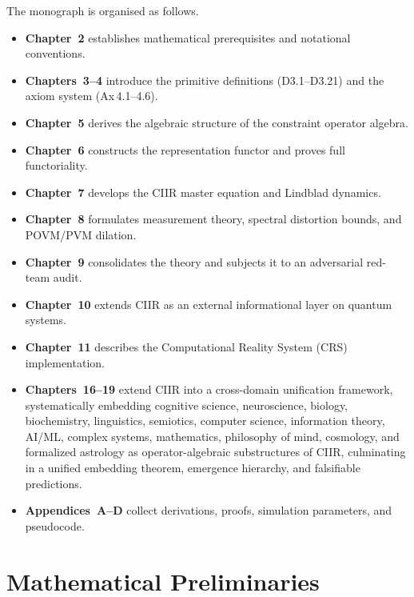 \documentclass[11pt,a4paper,openany]{book}
\theoremstyle{remark}
\begin{document}
The monograph is organised as follows.
\begin{itemize}[nosep]
  \item \textbf{Chapter~2} establishes mathematical prerequisites and
        notational conventions.
  \item \textbf{Chapters~3--4} introduce the primitive definitions
        (D3.1--D3.21) and the axiom system (Ax\,4.1--4.6).
  \item \textbf{Chapter~5} derives the algebraic structure of the
        constraint operator algebra.
  \item \textbf{Chapter~6} constructs the representation functor and
        proves full functoriality.
  \item \textbf{Chapter~7} develops the CIIR master equation and
        Lindblad dynamics.
  \item \textbf{Chapter~8} formulates measurement theory, spectral
        distortion bounds, and POVM/PVM dilation.
  \item \textbf{Chapter~9} consolidates the theory and subjects it to
        an adversarial red-team audit.
  \item \textbf{Chapter~10} extends CIIR as an external informational
        layer on quantum systems.
  \item \textbf{Chapter~11} describes the Computational Reality System
        (CRS) implementation.
  \item \textbf{Chapters~16--19} extend CIIR into a cross-domain
        unification framework, systematically embedding cognitive
        science, neuroscience, biology, biochemistry, linguistics,
        semiotics, computer science, information theory, AI/ML,
        complex systems, mathematics, philosophy of mind, cosmology,
        and formalized astrology as operator-algebraic substructures
        of CIIR, culminating in a unified embedding theorem, emergence
        hierarchy, and falsifiable predictions.
  \item \textbf{Appendices~A--D} collect derivations, proofs,
        simulation parameters, and pseudocode.
\end{itemize}

\chapter{Mathematical Preliminaries}
\label{ch:preliminaries}
\end{document}
